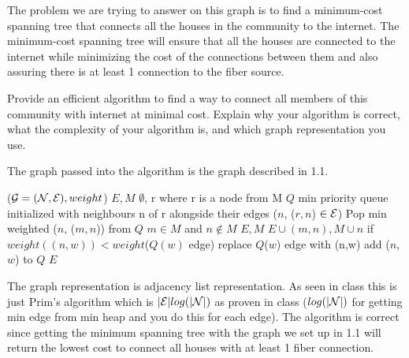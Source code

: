 \begin{problem}
\begin{questions}
The problem we are trying to answer on this graph is to find a minimum-cost spanning tree that connects all the houses in the community to the internet. The minimum-cost spanning tree will ensure that all the houses are connected to the internet while minimizing the cost of the connections between them and also assuring there is at least 1 connection to the fiber source.

\item Provide an efficient algorithm to find a way to connect all members of this community with internet at minimal cost. Explain why your algorithm is correct, what the complexity of your algorithm is, and which graph representation you use.

The graph passed into the algorithm is the graph described in 1.1.

\begin{myalgo}{($\mathcal{G} = (\mathcal{N}, \mathcal{E}), weight$)}
  \STATE $E, M$ \GETS $\emptyset$, r where r is a node from M
  \STATE $Q$ \GETS min priority queue initialized with neighbours n of r alongside their edges ($n$, ($r,n$) $\in \mathcal{E}$)
    \STATE Pop min weighted ($n$, ($m,n$)) from $Q$ $m \in M$ and $n \notin M$
    \STATE $E, M$ \GETS $E \cup {(m,n)}, M \cup {n}$
        \STATE if $weight((n,w)) < weight$($Q(w)$ edge) replace $Q$($w$) edge with (n,w)
      \ELSE
        \STATE add ($n$, $w$) to $Q$
      \ENDIF
    \ENDFOR
  \ENDWHILE
  \RETURN $E$
\end{myalgo}

The graph representation is adjacency list representation. As seen in class this is just Prim's algorithm which is $|\mathcal{E}| log(|\mathcal{N}|)$ as proven in class ($log(|\mathcal{N}|)$ for getting min edge from min heap and you do this for each edge).
The algorithm is correct since getting the minimum spanning tree with the graph we set up in 1.1 will return the lowest cost to connect all houses with at least 1 fiber connection.

\end{questions}
\end{problem}

